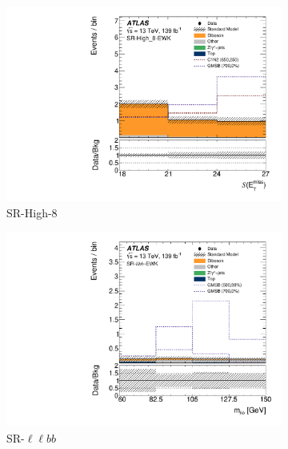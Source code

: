 \begin{figure}[tp]
\centering
\begin{subfigure}{0.49\textwidth}
    \centering
    \includegraphics[width=\textwidth]{figures/2ljets_sr_high_8_met_sig.pdf}
    \caption{SR-High-8}
\end{subfigure}
\hfill
\begin{subfigure}{0.49\textwidth}
    \centering
    \includegraphics[width=\textwidth]{figures/2ljets_sr_llbb_mbb.pdf}
    \caption{SR-$\ell\ell bb$}
\end{subfigure}
\\[0.5em]
\begin{subfigure}{0.49\textwidth}
    \centering

\end{subfigure}
\end{figure}
